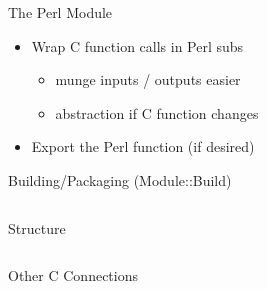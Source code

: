 \documentclass{beamer}
\begin{document}
\begin{frame}[fragile]{The Perl Module}
  \begin{block}{}
    \scriptsize
    
  \end{block}
  \begin{itemize}
    \item Wrap C function calls in Perl subs
    \begin{itemize}
      \item munge inputs / outputs easier
      \item abstraction if C function changes
    \end{itemize}
    \item Export the Perl function (if desired)
  \end{itemize}
\end{frame}

\begin{frame}{Building/Packaging (Module::Build)}
  
  \begin{columns}
    \begin{column}{0.49\linewidth}
      \begin{block}{Structure}
      \end{block}
    \end{column}
    \begin{column}{0.49\linewidth}

    \end{column}
  \end{columns}
\end{frame}

\begin{frame}{Other C Connections}

\end{frame}
\end{document}
